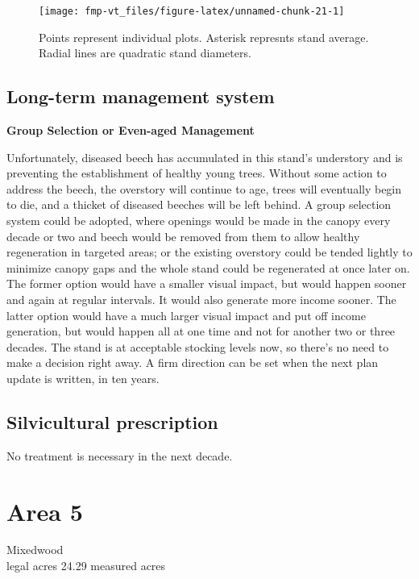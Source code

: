 \documentclass[]{tufte-handout}
\begin{document}
\begin{figure}
\texttt{[image: fmp-vt\_files/figure-latex/unnamed-chunk-21-1]} \caption[Points represent individual plots]{Points represent individual plots. Asterisk represnts stand average. Radial lines are quadratic stand diameters.}\label{fig:unnamed-chunk-21}
\end{figure}

\subsection{Long-term management
system}\label{long-term-management-system-3}

\textbf{Group Selection or Even-aged Management}

Unfortunately, diseased beech has accumulated in this stand's understory
and is preventing the establishment of healthy young trees. Without some
action to address the beech, the overstory will continue to age, trees
will eventually begin to die, and a thicket of diseased beeches will be
left behind. A group selection system could be adopted, where openings
would be made in the canopy every decade or two and beech would be
removed from them to allow healthy regeneration in targeted areas; or
the existing overstory could be tended lightly to minimize canopy gaps
and the whole stand could be regenerated at once later on. The former
option would have a smaller visual impact, but would happen sooner and
again at regular intervals. It would also generate more income sooner.
The latter option would have a much larger visual impact and put off
income generation, but would happen all at one time and not for another
two or three decades. The stand is at acceptable stocking levels now, so
there's no need to make a decision right away. A firm direction can be
set when the next plan update is written, in ten years.

\subsection{Silvicultural
prescription}\label{silvicultural-prescription-3}

No treatment is necessary in the next decade.

\newpage

\section{Area 5}\label{area-5}

Mixedwood\\
 legal acres \textbar{} 24.29 measured acres
\end{document}
